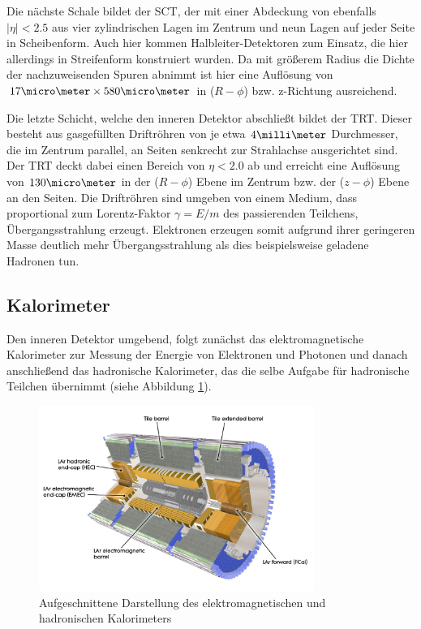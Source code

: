 Die nächste Schale bildet der \acf{SCT}, der mit einer Abdeckung von ebenfalls
$|\eta| < 2.5$ aus vier zylindrischen Lagen im Zentrum und neun Lagen auf jeder
Seite in Scheibenform. Auch hier kommen Halbleiter-Detektoren zum Einsatz, die
hier allerdings in Streifenform konstruiert wurden. Da mit größerem Radius die
Dichte der nachzuweisenden Spuren abnimmt ist hier eine Auflösung von
$17\micro\meter \times 580\micro\meter$ in ($R-\phi$) bzw. z-Richtung
ausreichend.

Die letzte Schicht, welche den inneren Detektor abschließt bildet der
\acf{TRT}.  Dieser besteht aus gasgefüllten Driftröhren von je etwa
$4\milli\meter$ Durchmesser, die im Zentrum parallel, an Seiten senkrecht zur
Strahlachse ausgerichtet sind. Der \ac{TRT} deckt dabei einen Bereich von
$\eta<2.0$ ab und erreicht eine Auflösung von $130\micro\meter$ in der
($R-\phi$) Ebene im Zentrum bzw. der ($z-\phi$) Ebene an den Seiten. Die
Driftröhren sind umgeben von einem Medium, dass proportional zum Lorentz-Faktor
$\gamma=E/m$ des passierenden Teilchens, Übergangsstrahlung erzeugt. Elektronen
erzeugen somit aufgrund ihrer geringeren Masse deutlich mehr Übergangsstrahlung
als dies beispielsweise geladene Hadronen tun.



\subsection{Kalorimeter}
\label{calorimeter}

Den inneren Detektor umgebend, folgt zunächst das elektromagnetische
Kalorimeter zur Messung der Energie von Elektronen und Photonen und danach
anschließend das hadronische Kalorimeter, das die selbe Aufgabe für hadronische
Teilchen übernimmt (siehe Abbildung \ref{fig:calorimeter}).

\begin{figure}
    \centering
    \includegraphics[width=0.8\textwidth]{img/calorimeter}
    \caption[Darstellung der Kalorimeter]
        {Aufgeschnittene Darstellung des elektromagnetischen und hadronischen
        Kalorimeters}
    \label{fig:calorimeter}
\end{figure}

